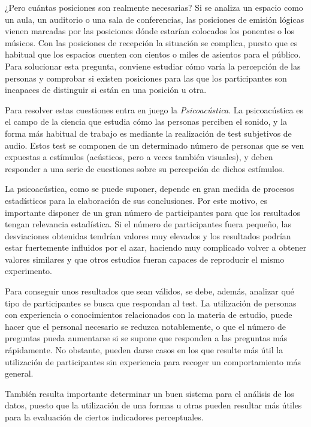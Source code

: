 \documentclass[11pt,a4paper]{book}
\begin{document}
    ¿Pero cuántas posiciones son realmente necesarias? Si se analiza un espacio como un aula, un auditorio o una sala de conferencias, las posiciones de emisión lógicas vienen marcadas por las posiciones dónde estarían colocados los ponentes o los músicos. Con las posiciones de recepción la situación se complica, puesto que es habitual que los espacios cuenten con cientos o miles de asientos para el público. Para solucionar esta pregunta, conviene estudiar cómo varía la percepción de las personas y comprobar si existen posiciones para las que los participantes son incapaces de distinguir si están en una posición u otra.
    
    Para resolver estas cuestiones entra en juego la \textit{Psicoacústica}. La psicoacústica es el campo de la ciencia que estudia cómo las personas perciben el sonido, y la forma más habitual de trabajo es mediante la realización de test subjetivos de audio. Estos test se componen de un determinado número de personas que se ven expuestas a estímulos (acústicos, pero a veces también visuales), y deben responder a una serie de cuestiones sobre su percepción de dichos estímulos.
    
    La psicoacústica, como se puede suponer, depende en gran medida de procesos estadísticos para la elaboración de sus conclusiones. Por este motivo, es importante disponer de un gran número de participantes para que los resultados tengan relevancia estadística. Si el número de participantes fuera pequeño, las desviaciones obtenidas tendrían valores muy elevados y los resultados podrían estar fuertemente influidos por el azar, haciendo muy complicado volver a obtener valores similares y que otros estudios fueran capaces de reproducir el mismo experimento.
    
    Para conseguir unos resultados que sean válidos, se debe, además, analizar qué tipo de participantes se busca que respondan al test. La utilización de personas con experiencia o conocimientos relacionados con la materia de estudio, puede hacer que el personal necesario se reduzca notablemente, o que el número de preguntas pueda aumentarse si se supone que responden a las preguntas más rápidamente. No obstante, pueden darse casos en los que resulte más útil la utilización de participantes sin experiencia para recoger un comportamiento más general.
    
    También resulta importante determinar un buen sistema para el análisis de los datos, puesto que la utilización de una formas u otras pueden resultar más útiles para la evaluación de ciertos indicadores perceptuales.
    
\end{document}
